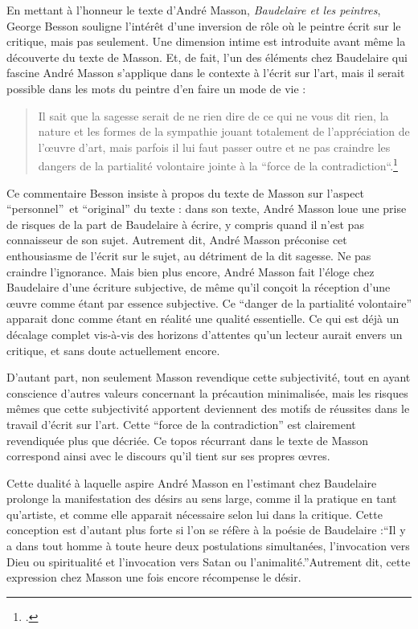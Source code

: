 	En mettant à l’honneur le texte d’André Masson, \emph{Baudelaire et les peintres}, George Besson souligne l’intérêt d’une inversion de rôle où le peintre écrit sur le critique, mais pas seulement. Une dimension intime est introduite avant même la découverte du texte de Masson. Et, de fait, l’un des éléments chez Baudelaire qui fascine André Masson s’applique dans le contexte à l’écrit sur l’art, mais il serait possible dans les mots du peintre d’en faire un mode de vie : 
\begin{quote}
Il sait que la sagesse serait de ne rien dire de ce qui ne vous dit rien, la nature et les formes de la sympathie jouant totalement de l’appréciation de l’\oe{}uvre d’art, mais parfois il lui faut passer outre et ne pas craindre les dangers de la partialité volontaire jointe à la “force de la contradiction“.\footcite{baudelairepeintres}\end{quote}

Ce commentaire Besson insiste à propos du texte de Masson sur l’aspect \enquote{personnel} et \enquote{original} du texte : dans son texte, André Masson loue une prise de risques de la part de Baudelaire à écrire, y compris quand il n’est pas connaisseur de son sujet. Autrement dit, André Masson préconise cet enthousiasme de l’écrit sur le sujet, au détriment de la dit sagesse. Ne pas craindre l’ignorance. Mais bien plus encore, André Masson fait l’éloge chez Baudelaire d’une écriture subjective, de même qu’il conçoit la réception d’une \oe{}uvre comme étant par essence subjective. Ce \enquote{danger de la partialité volontaire} apparait donc comme étant en réalité une qualité essentielle. Ce qui est déjà un décalage complet vis-à-vis des horizons d’attentes qu’un lecteur aurait envers un critique, et sans doute actuellement encore. 

	D’autant part, non seulement Masson revendique cette subjectivité, tout en ayant conscience d’autres valeurs concernant la précaution minimalisée, mais les risques mêmes que cette subjectivité apportent deviennent des motifs de réussites dans le travail d’écrit sur l’art. Cette \enquote{force de la contradiction} est clairement revendiquée plus que décriée. Ce topos récurrant dans le texte de Masson correspond ainsi avec le discours qu'il tient sur ses propres \oe{}vres.

Cette dualité à laquelle aspire André Masson en l’estimant chez Baudelaire prolonge la manifestation des désirs au sens large, comme il la pratique en tant qu’artiste, et comme elle apparait nécessaire selon lui dans la critique. Cette conception est d’autant plus forte si l’on se réfère à la poésie de Baudelaire :\enquote{Il y a dans tout homme à toute heure deux postulations simultanées, l’invocation vers Dieu ou spiritualité et l’invocation vers Satan ou l’animalité.}Autrement dit, cette expression chez Masson une fois encore récompense le désir. 

